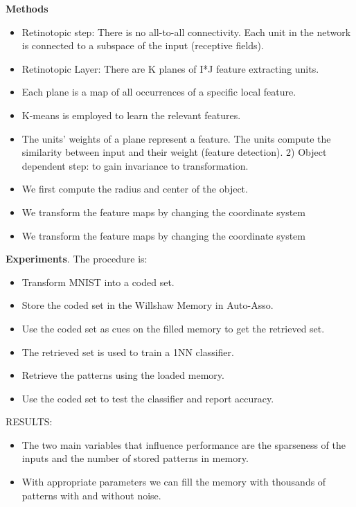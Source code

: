 \documentclass{article}
\begin{document}
\textbf{Methods}
\begin{itemize}
\item Retinotopic step: There is no all-to-all connectivity. Each unit in the network is connected to a subspace of the input (receptive fields).
\item Retinotopic Layer:
There are K planes of I*J feature extracting units.
\item Each plane is a map of all occurrences of a specific local feature.
\item K-means is employed to learn the relevant features.
\item The units' weights of a plane represent a feature. The units compute the similarity between input and their weight (feature detection).
2) Object dependent step: to gain invariance to transformation.
\item We first compute the radius and center of the object.
\item We transform the feature maps by changing the coordinate system
\item We transform the feature maps by changing the coordinate system
\end{itemize}

\textbf{Experiments}. The procedure is:
\begin{itemize}
\item Transform MNIST into a coded set.
\item Store the coded set in the Willshaw Memory in Auto-Asso.
\item Use the coded set as cues on the filled memory to get the retrieved set.
\item The retrieved set is used to train a 1NN classifier.
\item Retrieve the patterns using the loaded memory.
\item Use the coded set to test the classifier and report accuracy.
\end{itemize}

RESULTS:
\begin{itemize}
\item The two main variables that influence performance are the sparseness of the inputs and the number of stored patterns in memory.
\item With appropriate parameters we can fill the memory with thousands of patterns with and without noise.
\end{itemize}
\end{document}
